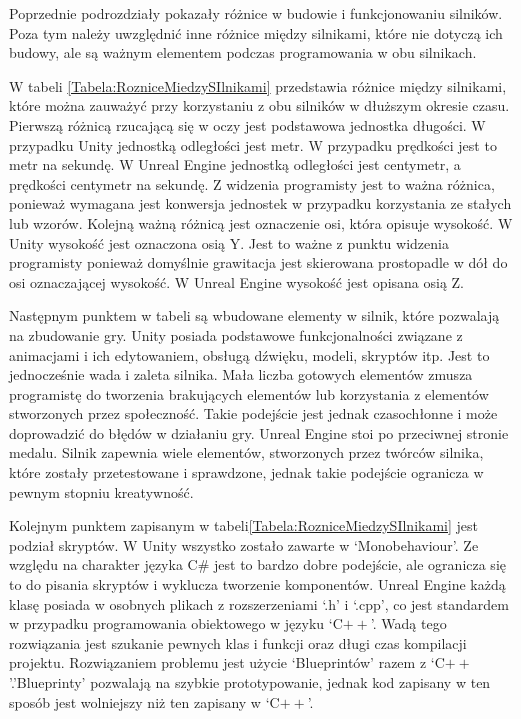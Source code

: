 \documentclass[12pt,twoside]{article}
\begin{document}
Poprzednie podrozdziały pokazały różnice w budowie i funkcjonowaniu silników.
Poza tym należy uwzględnić inne różnice między silnikami, które nie dotyczą ich
budowy, ale są ważnym elementem podczas programowania w obu silnikach. 

W tabeli \ref{Tabela:RozniceMiedzySIlnikami} przedstawia różnice między
silnikami, które można zauważyć przy korzystaniu z obu silników w dłuższym
okresie czasu. Pierwszą różnicą rzucającą się w oczy jest podstawowa jednostka
długości. W przypadku Unity jednostką odległości jest metr. W przypadku
prędkości jest to metr na sekundę. W Unreal Engine jednostką odległości jest
centymetr, a prędkości centymetr na sekundę. Z widzenia programisty jest to
ważna różnica, ponieważ wymagana jest konwersja jednostek w przypadku
korzystania ze stałych lub wzorów. Kolejną ważną różnicą jest oznaczenie osi,
która opisuje wysokość. W Unity wysokość jest oznaczona osią Y. Jest to ważne z
punktu widzenia programisty ponieważ domyślnie grawitacja jest skierowana
prostopadle w dół do osi oznaczającej wysokość. W Unreal Engine wysokość jest
opisana osią Z. 

Następnym punktem w tabeli są wbudowane elementy w silnik, które pozwalają na
zbudowanie gry. Unity posiada podstawowe funkcjonalności związane z animacjami i
ich edytowaniem, obsługą dźwięku, modeli, skryptów itp. Jest to jednocześnie
wada i zaleta silnika. Mała liczba gotowych elementów zmusza programistę do tworzenia
brakujących elementów lub korzystania z elementów stworzonych przez społeczność.
Takie podejście jest jednak czasochłonne i może doprowadzić do błędów w
działaniu gry. Unreal Engine stoi po przeciwnej stronie medalu. Silnik zapewnia
wiele elementów, stworzonych przez twórców silnika, które zostały przetestowane
i sprawdzone, jednak takie podejście ogranicza w pewnym stopniu kreatywność. 

Kolejnym punktem zapisanym w tabeli\ref{Tabela:RozniceMiedzySIlnikami} jest
podział skryptów. W Unity wszystko zostało zawarte w ‘Monobehaviour’. Ze względu
na charakter języka C\# jest to bardzo dobre podejście, ale ogranicza się to do
pisania skryptów i wyklucza tworzenie komponentów. Unreal Engine każdą klasę
posiada w osobnych plikach z rozszerzeniami ‘.h’ i ‘.cpp’, co jest standardem w
przypadku programowania obiektowego w języku ‘C$++$’. Wadą tego rozwiązania jest
szukanie pewnych klas i funkcji oraz długi czas kompilacji projektu.
Rozwiązaniem problemu jest użycie ‘Blueprintów’ razem z ‘C$++$’.’Blueprinty’
pozwalają na szybkie prototypowanie, jednak kod zapisany w ten sposób jest
wolniejszy niż ten zapisany w ‘C$++$’.
\end{document}
